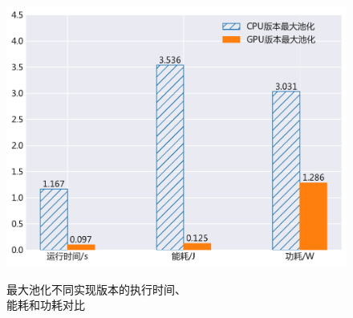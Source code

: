 \begin{figure}[htbp]
\begin{minipage}[b]{.6\linewidth}
    \begin{center}
    \includegraphics[height=0.65\textwidth]{figures/pool_energy.pdf}
    \end{center}
    \caption{最大池化不同实现版本的执行时间、\\能耗和功耗对比}\label{figure:figure12}
\end{minipage}
\begin{minipage}[b]{.4\linewidth}
\centering
{}
\label{table:table3}
\end{minipage}
\end{figure}

%

